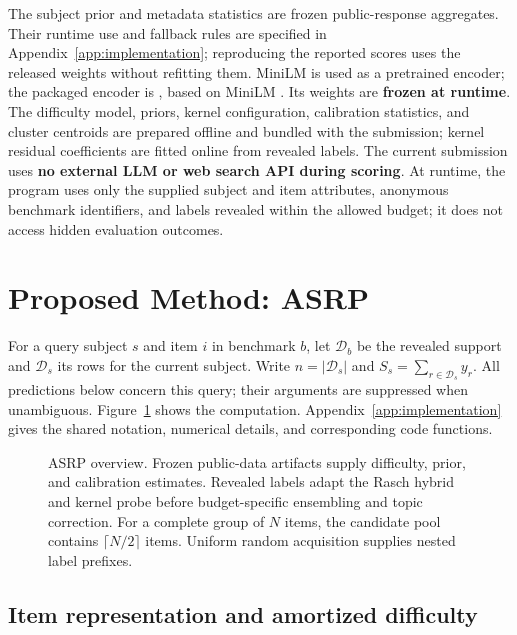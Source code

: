 \documentclass{article}
\begin{document}
The subject prior and metadata statistics are frozen public-response aggregates. Their runtime use and fallback rules are specified in Appendix~\ref{app:implementation}; reproducing the reported scores uses the released weights without refitting them. MiniLM is used as a pretrained encoder; the packaged encoder is , based on MiniLM \citep{wang2020minilm}. Its weights are \textbf{frozen at runtime}. The difficulty model, priors, kernel configuration, calibration statistics, and cluster centroids are prepared offline and bundled with the submission; kernel residual coefficients are fitted online from revealed labels. The current submission uses \textbf{no external LLM or web search API during scoring}. At runtime, the program uses only the supplied subject and item attributes, anonymous benchmark identifiers, and labels revealed within the allowed budget; it does not access hidden evaluation outcomes.

\section{Proposed Method: ASRP}\label{sec:method}

For a query subject $s$ and item $i$ in benchmark $b$, let $\mathcal D_b$ be the revealed support and $\mathcal D_s$ its rows for the current subject. Write $n=|\mathcal D_s|$ and $S_s=\sum_{r\in\mathcal D_s}y_r$. All predictions below concern this query; their arguments are suppressed when unambiguous. Figure~\ref{fig:method} shows the computation. Appendix~\ref{app:implementation} gives the shared notation, numerical details, and corresponding code functions.

\begin{figure}[H]
  \centering
  \caption{ASRP overview. Frozen public-data artifacts supply difficulty, prior, and calibration estimates. Revealed labels adapt the Rasch hybrid and kernel probe before budget-specific ensembling and topic correction. For a complete group of $N$ items, the candidate pool contains $\lceil N/2\rceil$ items. Uniform random acquisition supplies nested label prefixes.}
  \label{fig:method}
\end{figure}

\subsection{Item representation and amortized difficulty}\label{sec:difficulty}
\end{document}

